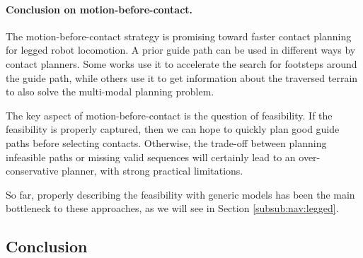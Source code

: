\paragraph{Conclusion on motion-before-contact.}

The motion-before-contact strategy is promising toward faster contact planning for legged robot locomotion.
A prior guide path can be used in different ways by contact planners. 
Some works use it to accelerate the search for footsteps around the guide path, while others use it to get information about the traversed terrain to also solve the multi-modal planning problem.


The key aspect of motion-before-contact is the question of feasibility. If the feasibility is properly captured, then we can hope to quickly plan good guide paths before selecting contacts. Otherwise, the trade-off between planning infeasible paths or missing valid sequences will certainly lead to an over-conservative planner, with strong practical limitations.

So far, properly describing the feasibility with generic models has been the main bottleneck to these approaches, as we will see in Section \ref{subsub:nav:legged}.


\subsection{Conclusion}

